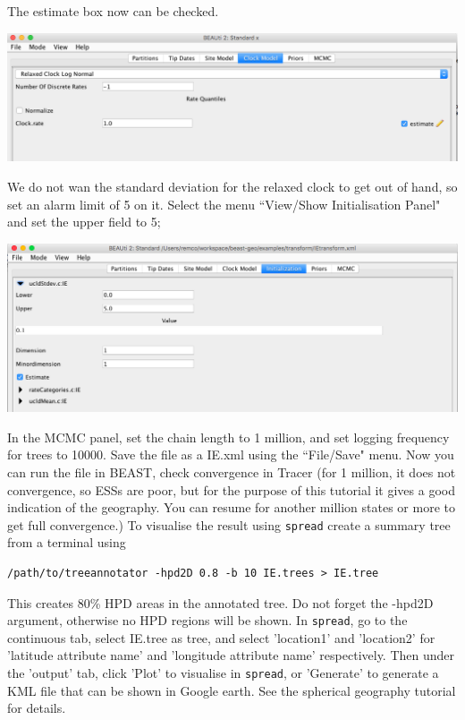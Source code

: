 \documentclass{article}
\begin{document}
The estimate box now can be checked.

\begin{center}
\includegraphics[scale=0.4]{figures/BEAUti_transform6}
\end{center}

We do not wan the standard deviation for the relaxed clock to get out of hand, so set an alarm limit of 5 on it. Select the menu ``View/Show Initialisation Panel" and set the upper field to 5;

\begin{center}
\includegraphics[scale=0.4]{figures/BEAUti_transform7} 
\end{center}

In the MCMC panel, set the chain length to 1 million, and set logging frequency for trees to 10000. Save the file as a IE.xml using the ``File/Save" menu. Now you can run the file in BEAST, check convergence in Tracer (for 1 million, it does not convergence, so ESSs are poor, but for the purpose of this tutorial it gives a good indication of the geography. You can resume for another million states or more to get full convergence.) To visualise the result using {\tt spread} create a summary tree from a terminal using
\begin{verbatim}
/path/to/treeannotator -hpd2D 0.8 -b 10 IE.trees > IE.tree
\end{verbatim}
This creates 80\% HPD areas in the annotated tree. Do not forget the -hpd2D argument, otherwise no HPD regions will be shown. 
In {\tt spread}, go to the continuous tab, select IE.tree as tree, and select 'location1' and 'location2' for 'latitude attribute name' and 'longitude attribute name' respectively. Then under the 'output' tab, click 'Plot' to visualise in {\tt spread}, or 'Generate' to generate a KML file that can be shown in Google earth. See the spherical geography tutorial for details.
\end{document}
